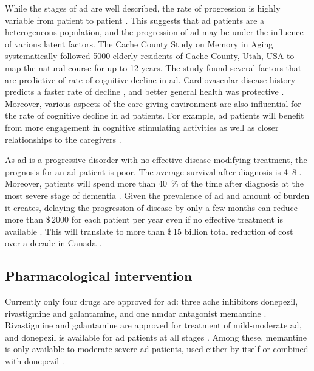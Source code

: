 While the stages of \gls{ad} are well described, the rate of progression is highly variable from patient to patient \citep{komarova11, tschanz11}. This suggests that \gls{ad} patients are a heterogeneous population, and the progression of \gls{ad} may be under the influence of various latent factors. The Cache County Study on Memory in Aging systematically followed \num{5000} elderly residents of Cache County, Utah, USA to map the natural course for up to \num{12} years. The study found several factors that are predictive of rate of cognitive decline in \gls{ad}. Cardiovascular disease history predicts a faster rate of decline \citep{mielke07}, and better general health was protective \citep{leoutsakos12}. Moreover, various aspects of the care-giving environment are also influential for the rate of cognitive decline in \gls{ad} patients. For example, \gls{ad} patients will benefit from more engagement in cognitive stimulating activities \citep{treiber11} as well as closer relationships to the caregivers \citep{norton09}.

As \gls{ad} is a progressive disorder with no effective disease-modifying treatment, the prognosis for an \gls{ad} patient is poor. The average survival after diagnosis is \SIrange{4}{8}{\year} \citep{larson04, helzner08}. Moreover, patients will spend more than \SI{40}{\percent} of the time after diagnosis at the most severe stage of dementia \citep{arrighi10}. Given the prevalence of \gls{ad} and amount of burden it creates, delaying the progression of disease by only a few months can reduce more than \$\,\num{2000} for each patient per year even if no effective treatment is available \citep{zhu06}. This will translate to more than \$\,15 billion total reduction of cost over a decade in Canada \citep{adc10}.

\subsection{Pharmacological intervention \label{treatment}}
Currently only four drugs are approved for \gls{ad}: three \gls{ache} inhibitors donepezil, rivastigmine and galantamine, and one \gls{nmdar} antagonist memantine \citep{nelson15}. Rivastigmine and galantamine are approved for treatment of mild-moderate \gls{ad}, and donepezil is available for \gls{ad} patients at all stages \citep{bassil09, smith09}. Among these, memantine is only available to moderate-severe \gls{ad} patients, used either by itself or combined with donepezil \citep{nelson15}.


